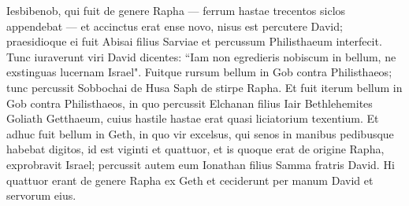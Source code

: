 \begin{biblechapter}
\verse Iesbibenob, qui fuit de genere Rapha — ferrum hastae trecentos siclos appendebat — et accinctus erat ense novo, nisus est percutere David;  
\verse praesidioque ei fuit Abisai filius Sarviae et percussum Philisthaeum interfecit. Tunc iuraverunt viri David dicentes: “Iam non egredieris nobiscum in bellum, ne exstinguas lucernam Israel". 
\verse Fuitque rursum bellum in Gob contra Philisthaeos; tunc percussit Sobbochai de Husa Saph de stirpe Rapha. 
\verse Et fuit iterum bellum in Gob contra Philisthaeos, in quo percussit Elchanan filius Iair Bethlehemites Goliath Getthaeum, cuius hastile hastae erat quasi liciatorium texentium. 
\verse Et adhuc fuit bellum in Geth, in quo vir excelsus, qui senos in manibus pedibusque habebat digitos, id est viginti et quattuor, et is quoque erat de origine Rapha, 
\verse exprobravit Israel; percussit autem eum Ionathan filius Samma fratris David. 
\verse Hi quattuor erant de genere Rapha ex Geth et ceciderunt per manum David et servorum eius. 
\end{biblechapter}


